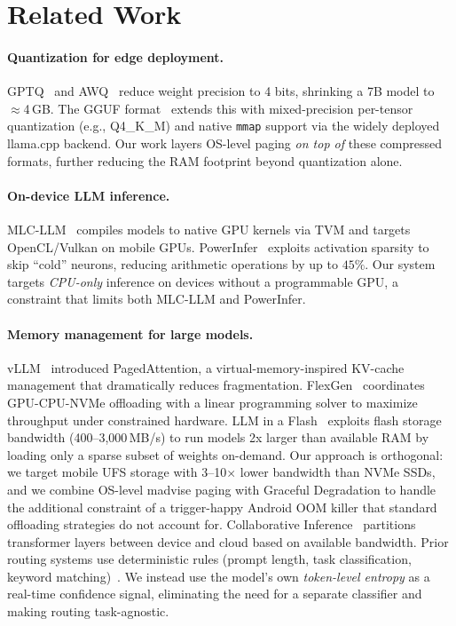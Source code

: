 \documentclass[11pt]{article}
\begin{document}
\section{Related Work}
\label{sec:related}

\paragraph{Quantization for edge deployment.}
GPTQ~\cite{gptq2023} and AWQ~\cite{awq2024} reduce weight precision to
4 bits, shrinking a 7B model to $\approx$4\,GB.
The GGUF format~\cite{gguf2023} extends this with mixed-precision
per-tensor quantization (e.g., Q4\_K\_M) and native \texttt{mmap} support
via the widely deployed llama.cpp backend.
Our work layers OS-level paging \emph{on top of} these compressed formats,
further reducing the RAM footprint beyond quantization alone.

\paragraph{On-device LLM inference.}
MLC-LLM~\cite{mlcllm2023} compiles models to native GPU kernels via
TVM and targets OpenCL/Vulkan on mobile GPUs.
PowerInfer~\cite{powerinfer2023} exploits activation sparsity to skip
``cold'' neurons, reducing arithmetic operations by up to $45\%$.
Our system targets \emph{CPU-only} inference on devices without a
programmable GPU, a constraint that limits both MLC-LLM and PowerInfer.

\paragraph{Memory management for large models.}
vLLM~\cite{vllm2023} introduced PagedAttention, a virtual-memory-inspired
KV-cache management that dramatically reduces fragmentation. FlexGen~\cite{flexgen2023}
coordinates GPU-CPU-NVMe offloading with a linear programming solver to maximize
throughput under constrained hardware. LLM in a Flash~\cite{llminflash2024} exploits
flash storage bandwidth (400--3,000\,MB/s) to run models 2x larger than available
RAM by loading only a sparse subset of weights on-demand. Our approach is
orthogonal: we target mobile UFS storage with 3--10$\times$ lower bandwidth than
NVMe SSDs, and we combine OS-level madvise paging with Graceful Degradation to
handle the additional constraint of a trigger-happy Android OOM killer that
standard offloading strategies do not account for.
Collaborative Inference~\cite{collaborative2025} partitions transformer
layers between device and cloud based on available bandwidth.
Prior routing systems use deterministic rules (prompt length, task
classification, keyword matching)~\cite{edgeroute2024}.
We instead use the model's own \emph{token-level entropy} as a
real-time confidence signal, eliminating the need for a separate
classifier and making routing task-agnostic.
\end{document}

